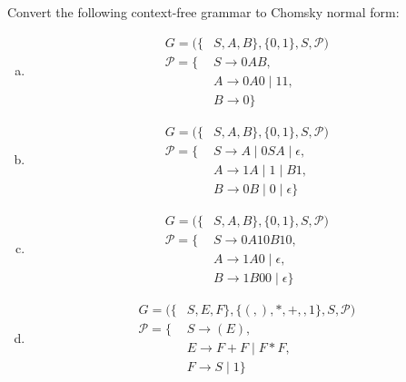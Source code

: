 \documentclass[a4paper,12pt]{amsart}
\begin{document}
    
\medskip\begin{problem}

    Convert the following context-free grammar to Chomsky normal form:
    \begin{multicols}{2}
        \begin{enumerate}[(a)]
    
            \item 
            \begin{align*}
            G=(\{&S,A,B\},\{0,1\},S,\mathcal P)\\
            \mathcal P=\{&S\rightarrow 0AB, \\
            &A\rightarrow 0A0\mid 11,\\
            &B\rightarrow 0\}
            \end{align*}
        
            \item 
            \begin{align*}
            G=(\{&S,A,B\},\{0,1\},S,\mathcal P)\\
            \mathcal P=\{&S\rightarrow A\mid 0SA\mid \epsilon, \\
            &A\rightarrow 1A\mid 1\mid B1,\\
            &B\rightarrow 0B\mid 0\mid \epsilon\} 
            \end{align*}
    
            \item 
            \begin{align*}
            G=(\{&S,A,B\},\{0,1\},S,\mathcal P)\\
            \mathcal P=\{
            &S\rightarrow 0A10B10, \\
            &A\rightarrow 1A0\mid \epsilon,\\
            &B\rightarrow 1B00\mid \epsilon\} 
            \end{align*}
    
            \item 
            \begin{align*}
            G=(\{&S,E,F\},\{(,),*,+,,1\},S,\mathcal P)\\
            \mathcal P=\{&
            S\rightarrow (E), \\
            &E\rightarrow F+F\mid F*F,\\
            &F\rightarrow S\mid 1\}
            \end{align*}

        \end{enumerate}
    \end{multicols}
        
\end{problem}
    
\end{document}
